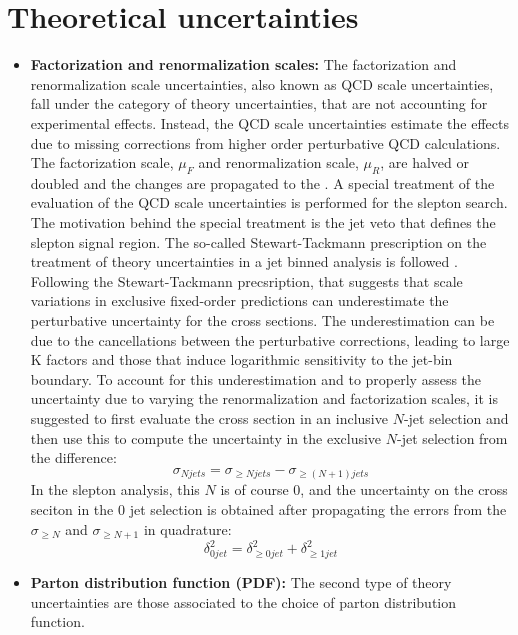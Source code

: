 \section{Theoretical uncertainties}
\noindent
\justify
\begin{itemize}
\item{\bf{Factorization and renormalization scales:}} The factorization and renormalization scale uncertainties, also known as QCD scale uncertainties, fall under the category of theory uncertainties, that are not accounting for experimental effects. 
Instead, the QCD scale uncertainties estimate the effects due to missing corrections from higher order perturbative QCD calculations. 
The factorization scale, $\mu_{F}$ and renormalization scale, $\mu_{R}$, are halved or doubled and the changes are propagated to the \ptmiss. 
A special treatment of the evaluation of the QCD scale uncertainties is performed for the slepton search. 
The motivation behind the special treatment is the jet veto that defines the slepton signal region. 
The so-called Stewart-Tackmann prescription on the treatment of theory uncertainties in a jet binned analysis is followed \cite{Stewart:2011cf}. 
Following the Stewart-Tackmann precsription, that suggests that scale variations in exclusive fixed-order predictions can underestimate the perturbative uncertainty for the cross sections. 
The underestimation can be due to the cancellations between the perturbative corrections, leading to large K factors and those that induce logarithmic sensitivity to the jet-bin boundary. 
To account for this underestimation and to properly assess the uncertainty due to varying the renormalization and factorization scales, it is suggested to first evaluate the cross section in an inclusive $N$-jet selection and then use this to compute the uncertainty in the exclusive $N$-jet selection from the difference:
\begin{equation}
    \sigma_{N jets} = \sigma_{\geq N jets} - \sigma_{\geq (N+1) jets}
\end{equation}
In the slepton analysis, this $N$ is of course 0, and the uncertainty on the cross seciton in the 0 jet selection is obtained after propagating the errors from the $ \sigma_{\geq N}$ and
$\sigma_{\geq N+1}$ in quadrature:
\begin{equation}
    \delta_{0 jet}^{2} = \delta_{\geq 0 jet}^{2} + \delta_{\geq 1 jet}^{2}
\end{equation}
\item{\bf{Parton distribution function (PDF):}} The second type of theory uncertainties are those associated to the choice of parton distribution function. 

\end{itemize}
